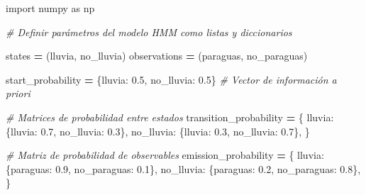 \documentclass[
  a4paper,
  DIV=11,
  numbers=noendperiod]{scrreprt}
\newenvironment{Shaded}{\begin{snugshade}}{\end{snugshade}}
\newcommand{\CommentTok}[1]{\textcolor[rgb]{0.56,0.35,0.01}{\textit{#1}}}
\newcommand{\FloatTok}[1]{\textcolor[rgb]{0.00,0.00,0.81}{#1}}
\newcommand{\ImportTok}[1]{#1}
\newcommand{\NormalTok}[1]{#1}
\newcommand{\OperatorTok}[1]{\textcolor[rgb]{0.81,0.36,0.00}{\textbf{#1}}}
\newcommand{\StringTok}[1]{\textcolor[rgb]{0.31,0.60,0.02}{#1}}
\begin{document}
\begin{Shaded}
\begin{Highlighting}[numbers=left,,]
\ImportTok{import}\NormalTok{ numpy }\ImportTok{as}\NormalTok{ np}

\CommentTok{\# Definir parámetros del modelo HMM como listas y diccionarios}

\NormalTok{states }\OperatorTok{=}\NormalTok{ (}\StringTok{\textquotesingle{}lluvia\textquotesingle{}}\NormalTok{, }\StringTok{\textquotesingle{}no\_lluvia\textquotesingle{}}\NormalTok{)}
\NormalTok{observations }\OperatorTok{=}\NormalTok{ (}\StringTok{\textquotesingle{}paraguas\textquotesingle{}}\NormalTok{, }\StringTok{\textquotesingle{}no\_paraguas\textquotesingle{}}\NormalTok{)}

\NormalTok{start\_probability }\OperatorTok{=}\NormalTok{ \{}\StringTok{\textquotesingle{}lluvia\textquotesingle{}}\NormalTok{: }\FloatTok{0.5}\NormalTok{, }\StringTok{\textquotesingle{}no\_lluvia\textquotesingle{}}\NormalTok{: }\FloatTok{0.5}\NormalTok{\} }\CommentTok{\# Vector de información a priori}

\CommentTok{\# Matrices de probabilidad entre estados }
\NormalTok{transition\_probability }\OperatorTok{=}\NormalTok{ \{}
    \StringTok{\textquotesingle{}lluvia\textquotesingle{}}\NormalTok{: \{}\StringTok{\textquotesingle{}lluvia\textquotesingle{}}\NormalTok{: }\FloatTok{0.7}\NormalTok{, }\StringTok{\textquotesingle{}no\_lluvia\textquotesingle{}}\NormalTok{: }\FloatTok{0.3}\NormalTok{\},}
    \StringTok{\textquotesingle{}no\_lluvia\textquotesingle{}}\NormalTok{: \{}\StringTok{\textquotesingle{}lluvia\textquotesingle{}}\NormalTok{: }\FloatTok{0.3}\NormalTok{, }\StringTok{\textquotesingle{}no\_lluvia\textquotesingle{}}\NormalTok{: }\FloatTok{0.7}\NormalTok{\},}
\NormalTok{\}}

\CommentTok{\# Matriz de probabilidad de observables }
\NormalTok{emission\_probability }\OperatorTok{=}\NormalTok{ \{}
    \StringTok{\textquotesingle{}lluvia\textquotesingle{}}\NormalTok{: \{}\StringTok{\textquotesingle{}paraguas\textquotesingle{}}\NormalTok{: }\FloatTok{0.9}\NormalTok{, }\StringTok{\textquotesingle{}no\_paraguas\textquotesingle{}}\NormalTok{: }\FloatTok{0.1}\NormalTok{\},}
    \StringTok{\textquotesingle{}no\_lluvia\textquotesingle{}}\NormalTok{: \{}\StringTok{\textquotesingle{}paraguas\textquotesingle{}}\NormalTok{: }\FloatTok{0.2}\NormalTok{, }\StringTok{\textquotesingle{}no\_paraguas\textquotesingle{}}\NormalTok{: }\FloatTok{0.8}\NormalTok{\},}
\NormalTok{\}}
\end{Highlighting}
\end{Shaded}
\end{document}
